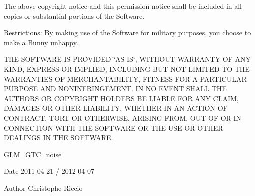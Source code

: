 The above copyright notice and this permission notice shall be included in all copies or substantial portions of the Software.

Restrictions\-: By making use of the Software for military purposes, you choose to make a Bunny unhappy.

T\-H\-E S\-O\-F\-T\-W\-A\-R\-E I\-S P\-R\-O\-V\-I\-D\-E\-D \char`\"{}\-A\-S I\-S\char`\"{}, W\-I\-T\-H\-O\-U\-T W\-A\-R\-R\-A\-N\-T\-Y O\-F A\-N\-Y K\-I\-N\-D, E\-X\-P\-R\-E\-S\-S O\-R I\-M\-P\-L\-I\-E\-D, I\-N\-C\-L\-U\-D\-I\-N\-G B\-U\-T N\-O\-T L\-I\-M\-I\-T\-E\-D T\-O T\-H\-E W\-A\-R\-R\-A\-N\-T\-I\-E\-S O\-F M\-E\-R\-C\-H\-A\-N\-T\-A\-B\-I\-L\-I\-T\-Y, F\-I\-T\-N\-E\-S\-S F\-O\-R A P\-A\-R\-T\-I\-C\-U\-L\-A\-R P\-U\-R\-P\-O\-S\-E A\-N\-D N\-O\-N\-I\-N\-F\-R\-I\-N\-G\-E\-M\-E\-N\-T. I\-N N\-O E\-V\-E\-N\-T S\-H\-A\-L\-L T\-H\-E A\-U\-T\-H\-O\-R\-S O\-R C\-O\-P\-Y\-R\-I\-G\-H\-T H\-O\-L\-D\-E\-R\-S B\-E L\-I\-A\-B\-L\-E F\-O\-R A\-N\-Y C\-L\-A\-I\-M, D\-A\-M\-A\-G\-E\-S O\-R O\-T\-H\-E\-R L\-I\-A\-B\-I\-L\-I\-T\-Y, W\-H\-E\-T\-H\-E\-R I\-N A\-N A\-C\-T\-I\-O\-N O\-F C\-O\-N\-T\-R\-A\-C\-T, T\-O\-R\-T O\-R O\-T\-H\-E\-R\-W\-I\-S\-E, A\-R\-I\-S\-I\-N\-G F\-R\-O\-M, O\-U\-T O\-F O\-R I\-N C\-O\-N\-N\-E\-C\-T\-I\-O\-N W\-I\-T\-H T\-H\-E S\-O\-F\-T\-W\-A\-R\-E O\-R T\-H\-E U\-S\-E O\-R O\-T\-H\-E\-R D\-E\-A\-L\-I\-N\-G\-S I\-N T\-H\-E S\-O\-F\-T\-W\-A\-R\-E.

\hyperlink{group__gtc__noise}{G\-L\-M\-\_\-\-G\-T\-C\-\_\-noise}

\begin{DoxyDate}{Date}
2011-\/04-\/21 / 2012-\/04-\/07 
\end{DoxyDate}
\begin{DoxyAuthor}{Author}
Christophe Riccio 
\end{DoxyAuthor}

